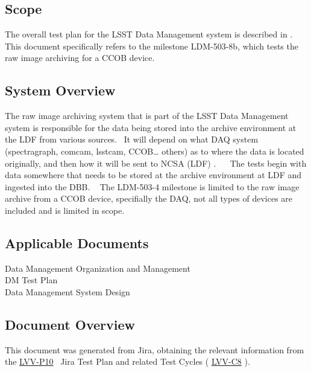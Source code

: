 \documentclass[DM,lsstdraft,STR,toc]{lsstdoc}
\begin{document}
\subsection{Scope}\label{scope}

The overall test plan for the LSST Data Management system is described
in .\\
This document specifically refers to the milestone LDM-503-8b, which
tests the raw image archiving for a CCOB device. ~



\subsection{System Overview}
\label{sect:systemoverview}

The raw image archiving system that is part of the LSST Data Management
system is responsible for the data being stored into the archive
environment at the LDF from various sources. ~It will depend on what DAQ
system (spectragraph, comcam, lsstcam, CCOB\ldots{} others) as to where
the data is located originally, and then how it will be sent to NCSA
(LDF) . ~ ~The tests begin with data somewhere that needs to be stored
at the archive environment at LDF and ingested into the DBB. ~ The
LDM-503-4 milestone is limited to the raw image archive from a CCOB
device, specifially the DAQ, not all types of devices are included and
is limited in scope. ~\\[2\baselineskip]

\subsection{Applicable Documents}\label{applicable-documents}

 Data Management Organization and Management\\
 DM Test Plan\\
 Data Management System Design~


\subsection{Document Overview}
\label{sect:docoverview}

This document was generated from Jira, obtaining the relevant information from the 
\href{https://jira.lsstcorp.org/secure/Tests.jspa#/testPlan/LVV-P10}{LVV-P10}
~Jira Test Plan and related Test Cycles (
  \href{https://jira.lsstcorp.org/secure/Tests.jspa#/testCycle/LVV-C8}{LVV-C8}
).
\end{document}
